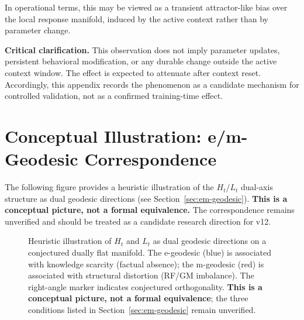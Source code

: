 \documentclass[11pt,a4paper]{article}
\begin{document}
In operational terms, this may be viewed as a transient attractor-like bias over the
local response manifold, induced by the active context rather than by parameter change.

\textbf{Critical clarification.} This observation does not imply parameter updates,
persistent behavioral modification, or any durable change outside the active context
window. The effect is expected to attenuate after context reset. Accordingly, this
appendix records the phenomenon as a candidate mechanism for controlled validation,
not as a confirmed training-time effect.


\section{Conceptual Illustration: e/m-Geodesic Correspondence}
\label{app:em-geodesic}

The following figure provides a heuristic illustration of the
$H_t$/$L_t$ dual-axis structure as dual geodesic directions
(see Section~\ref{sec:em-geodesic}).
\textbf{This is a conceptual picture, not a formal equivalence.}
The correspondence remains unverified and should be treated as
a candidate research direction for v12.

\begin{figure}[h]
\centering
{}
\caption{Heuristic illustration of $H_t$ and $L_t$ as dual geodesic
directions on a conjectured dually flat manifold. The e-geodesic
(blue) is associated with knowledge scarcity (factual absence);
the m-geodesic (red) is associated with structural distortion
(RF/GM imbalance). The right-angle marker indicates conjectured
orthogonality. \textbf{This is a conceptual picture, not a formal
equivalence}; the three conditions listed in Section~\ref{sec:em-geodesic}
remain unverified.}
\label{fig:em-geodesic-appendix}
\end{figure}
\end{document}

